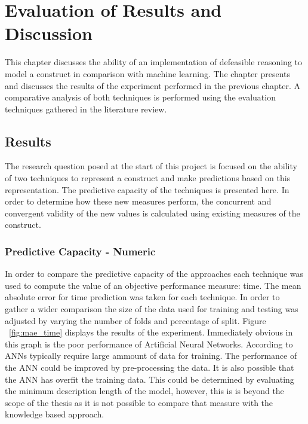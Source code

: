 
\chapter{Evaluation of Results and Discussion} %

\label{Chapter5} %


This chapter discusses the ability of an implementation of defeasible reasoning to model a construct in comparison with machine learning. The chapter presents and discusses the results of the experiment performed in the previous chapter. A comparative analysis of both techniques is performed using the evaluation techniques gathered in the literature review.

\section{Results}

The research question posed at the start of this project is focused on the ability of two techniques to represent a construct and make predictions based on this representation. The predictive capacity of the techniques is presented here. In order to determine how these new measures perform, the concurrent and convergent validity of the new values is calculated using existing measures of the construct. 

\subsection{Predictive Capacity - Numeric}

In order to compare the predictive capacity of the approaches each technique was used to compute the value of an objective performance measure: time. The mean absolute error for time prediction was taken for each technique. In order to gather a wider comparison the size of the data used for training and testing was adjusted by varying the number of folds and percentage of split. Figure ~\ref{fig:mae_time} displays the results of the experiment. Immediately obvious in this graph is the poor performance of Artificial Neural Networks. According to \cite{silvert2000can} ANNs typically require large ammount of data for training. The performance of the ANN could be improved by pre-processing the data. It is also possible that the ANN has overfit the training data. This could be determined by evaluating the minimum description length of the model, however, this is is beyond the scope of the thesis as it is not possible to compare that measure with the knowledge based approach.

